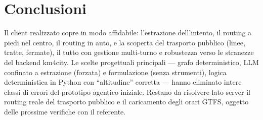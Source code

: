 \documentclass[11pt,a4paper]{article}
\begin{document}
\section{Conclusioni}
Il client realizzato copre in modo affidabile: l'estrazione dell'intento,
il routing a piedi nel centro, il routing in auto, e la scoperta del trasporto
pubblico (linee, tratte, fermate), il tutto con gestione multi-turno e
robustezza verso le stranezze del backend km4city. Le scelte progettuali
principali --- grafo deterministico, LLM confinato a estrazione (forzata) e
formulazione (senza strumenti), logica deterministica in Python con
``altitudine'' corretta --- hanno eliminato intere classi di errori del
prototipo agentico iniziale. Restano da risolvere lato server il routing reale
del trasporto pubblico e il caricamento degli orari GTFS, oggetto delle prossime
verifiche con il referente.
\end{document}
